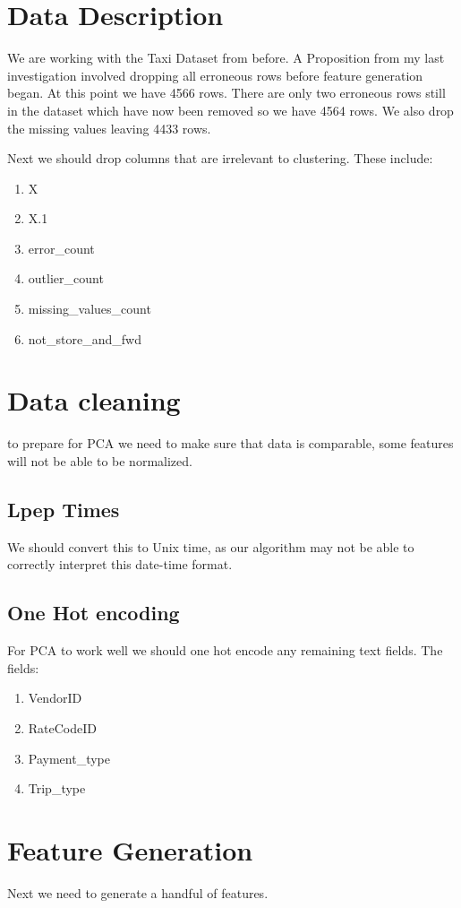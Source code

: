 \documentclass{article}
\begin{document}
\section{Data Description}
We are working with the Taxi Dataset from before. A Proposition from my last investigation involved dropping all erroneous rows before feature generation began. At this point we have 4566 rows. There are only two erroneous rows still in the dataset which have now been removed so we have 4564 rows. We also drop the missing values leaving 4433 rows.


Next we should drop columns that are irrelevant to clustering. These include:
\begin{enumerate}
\item X
\item X.1
\item error\_count
\item outlier\_count
\item missing\_values\_count
\item not\_store\_and\_fwd
\end{enumerate}

\section{Data cleaning}
to prepare for PCA we need to make sure that data is comparable, some features will not be able to be normalized.
\subsection{Lpep Times}
We should convert this to Unix time, as our algorithm may not be able to correctly interpret this date-time format.
\subsection{One Hot encoding}
For PCA to work well we should one hot encode any remaining text fields. The fields:
\begin{enumerate}
\item VendorID
\item RateCodeID
\item Payment\_type
\item Trip\_type
\end{enumerate}

\section{Feature Generation}
Next we need to generate a handful of features.
\end{document}
